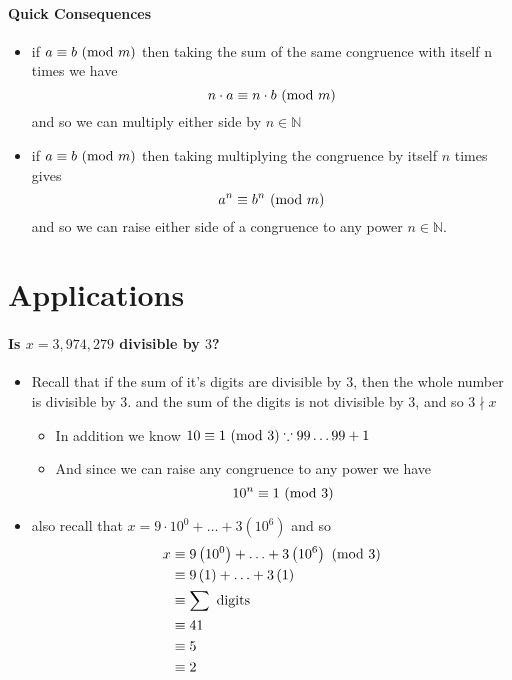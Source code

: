 \documentclass[11pt]{book}
\begin{document}
\paragraph{Quick Consequences} 
\begin{itemize}
    \item if $a \equiv b \ (\mathrm{mod}\ m) $ then taking the sum of the same congruence with itself n times we have 
\[
n  \cdot a \equiv n  \cdot b \ (\mathrm{mod}\ m) 
\]
and so we can multiply either side by $n \in \mathbb{N} $ 
    \item if $a \equiv b \ (\mathrm{mod}\ m) $ then taking multiplying the congruence by itself $n$ times gives 
        \[
        a^{n}  \equiv b^{n}  \ (\mathrm{mod}\ m) 
        \]
        and so we can raise either side of a congruence to any power $n \in \mathbb{N} $. 
\end{itemize}


\section{Applications}%
\label{sec:applications}

\paragraph{Is $x = 3,974,279$ divisible by $3$? } 
\begin{itemize}
    \item Recall that if the sum of it's digits are divisible by 3, then the whole number is divisible by 3. and the sum of the digits is not divisible by 3, and so $3 \nmid x$ 
        \begin{itemize}
            \item In addition we know $10 \equiv 1 \ (\mathrm{mod}\ 3) \because 99\ldots 99  + 1$ 
            \item And since we can raise any congruence to any power we have 
                \[
                10^{n}  \equiv 1 \ (\mathrm{mod}\ 3) 
                \]
        \end{itemize}
    \item also recall that $x = 9  \cdot 10^{0}  + \ldots  + 3\left( 10^{6}  \right) $ and so 
        \begin{align*}
            x &\equiv 9\left( 10^{0}  \right)  + \ldots  + 3\left( 10^{6}  \right)  \ (\mathrm{mod}\ 3) \\
            &\equiv  9\left( 1 \right)  + \ldots  + 3\left( 1 \right)    \\ 
            &\equiv  \sum \text{ digits  } \\
            &\equiv 41   \\ 
            &\equiv 5   \\ 
            &\equiv 2  
        \end{align*}
\end{itemize}
\end{document}
